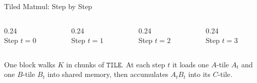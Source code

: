 \begin{frame}{Tiled Matmul: Step by Step}
  \begin{columns}[T]
    \begin{column}{0.24\textwidth}
      \centering
      \\[0.2em]
      {\scriptsize Step $t = 0$}
    \end{column}
    \begin{column}{0.24\textwidth}
      \centering
      \\[0.2em]
      {\scriptsize Step $t = 1$}
    \end{column}
    \begin{column}{0.24\textwidth}
      \centering
      \\[0.2em]
      {\scriptsize Step $t = 2$}
    \end{column}
    \begin{column}{0.24\textwidth}
      \centering
      \\[0.2em]
      {\scriptsize Step $t = 3$}
    \end{column}
  \end{columns}

  \vspace{0.6em}
  {\small One block walks $K$ in chunks of $\mathtt{TILE}$. At each step $t$ it loads one $A$-tile $A_t$ and one $B$-tile $B_t$ into shared memory, then accumulates $A_t B_t$ into its $C$-tile.}
\end{frame}

